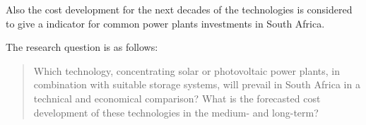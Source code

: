 Also the cost development for the next decades of the technologies is considered to give a indicator for common power plants investments in South Africa.

The research question is as follows:
\begin{quote}
Which technology, concentrating solar or photovoltaic power plants, in combination with suitable storage systems, will prevail in South Africa in a technical and economical comparison? What is the forecasted cost development of these technologies in the medium- and long-term?
\end{quote}